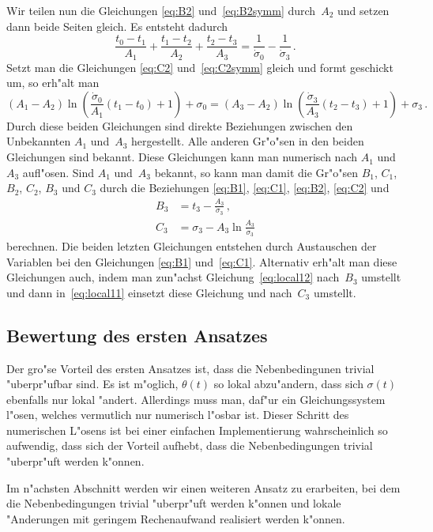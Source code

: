 \documentclass[a4paper]{scrartcl}
\begin{document}
Wir teilen nun die Gleichungen \eqref{eq:B2} und~\eqref{eq:B2symm} durch~$A_2$ und setzen dann beide Seiten gleich. Es entsteht dadurch
$$ \frac{t_0-t_1}{A_1}+\frac{t_1-t_2}{A_2}+\frac{t_2-t_3}{A_3} 
  = \frac{1}{\dot\sigma_0}-\frac{1}{\dot\sigma_3}\,. $$
Setzt man die Gleichungen \eqref{eq:C2} und~\eqref{eq:C2symm} gleich und formt geschickt um, so erh"alt man
$$ (A_1-A_2)\ln\left(\frac{\dot\sigma_0}{A_1}(t_1-t_0)+1\right)+\sigma_0
  = (A_3-A_2)\ln\left(\frac{\dot\sigma_3}{A_3}(t_2-t_3)+1\right)+\sigma_3\,. $$
Durch diese beiden Gleichungen sind direkte Beziehungen zwischen den Unbekannten $A_1$ und~$A_3$ hergestellt. Alle anderen Gr"o"sen in den beiden Gleichungen sind bekannt. Diese Gleichungen kann man numerisch nach $A_1$ und~$A_3$ aufl"osen. Sind $A_1$ und~$A_3$ bekannt, so kann man damit die Gr"o"sen $B_1$, $C_1$, $B_2$, $C_2$, $B_3$ und $C_3$ durch die Beziehungen \eqref{eq:B1}, \eqref{eq:C1}, \eqref{eq:B2}, \eqref{eq:C2} und 
\begin{align*}
  B_3 &= t_3-\frac{A_3}{\dot\sigma_3}\,, \\
  C_3 &= \sigma_3-A_3\ln\frac{A_3}{\dot\sigma_3}
\end{align*}
berechnen. Die beiden letzten Gleichungen entstehen durch Austauschen der Variablen bei den Gleichungen \eqref{eq:B1} und~\eqref{eq:C1}. Alternativ erh"alt man diese Gleichungen auch, indem man zun"achst Gleichung~\eqref{eq:local12} nach~$B_3$ umstellt und dann in~\eqref{eq:local11} einsetzt diese Gleichung und nach~$C_3$ umstellt. 


\subsection{Bewertung des ersten Ansatzes}

Der gro"se Vorteil des ersten Ansatzes ist, dass die Nebenbedingunen trivial "uberpr"ufbar sind. Es ist m"oglich, $\theta(t)$ so lokal abzu"andern, dass sich $\sigma(t)$ ebenfalls nur lokal "andert. Allerdings muss man, daf"ur ein Gleichungssystem l"osen, welches vermutlich nur numerisch l"osbar ist. Dieser Schritt des numerischen L"osens ist bei einer einfachen Implementierung wahrscheinlich so aufwendig, dass sich der Vorteil aufhebt, dass die Nebenbedingungen trivial "uberpr"uft werden k"onnen. 

Im n"achsten Abschnitt werden wir einen weiteren Ansatz zu erarbeiten, bei dem die Nebenbedingungen trivial "uberpr"uft werden k"onnen und lokale "Anderungen mit geringem Rechenaufwand realisiert werden k"onnen.
\end{document}
